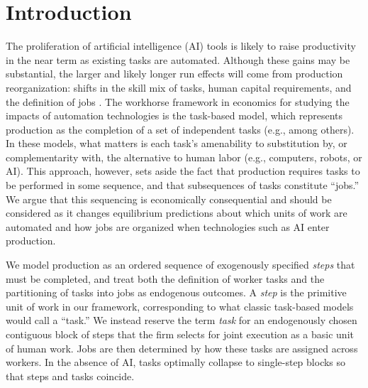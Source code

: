 \section{Introduction}

The proliferation of artificial intelligence (AI) tools is likely to raise productivity in the near term as existing tasks are automated.
Although these gains may be substantial, the larger and likely longer run effects will come from production reorganization: 
shifts in the skill mix of tasks, human capital requirements, and the definition of jobs \citep{brynjolfsson2021productivity}. 
The workhorse framework in economics for studying the impacts of automation technologies is the task-based model, which represents production as the completion of a set of independent tasks (e.g., \citealp{acemoglu2011skills} among others). 
In these models, what matters is each task's amenability to substitution by, or complementarity with, the alternative to human labor (e.g., computers, robots, or AI). 
This approach, however, sets aside the fact that production requires tasks to be performed in some sequence, and that subsequences of tasks constitute ``jobs.'' 
We argue that this sequencing is economically consequential and should be considered as it changes equilibrium predictions about which units of work are automated and how jobs are organized when technologies such as AI enter production. 

We model production as an ordered sequence of exogenously specified \emph{steps} that must be completed, and treat both the definition of worker tasks and the partitioning of tasks into jobs as endogenous outcomes.
A \emph{step} is the primitive unit of work in our framework, corresponding to what classic task-based models would call a ``task.''
We instead reserve the term \emph{task} for an endogenously chosen contiguous block of steps that the firm selects for joint execution as a basic unit of human work.
Jobs are then determined by how these tasks are assigned across workers.
In the absence of AI, tasks optimally collapse to single-step blocks so that steps and tasks coincide.

